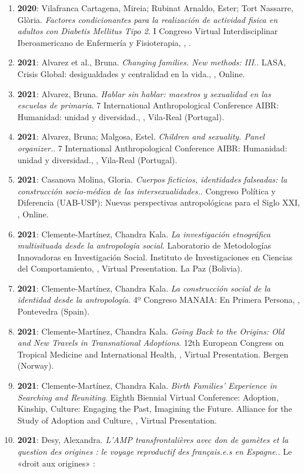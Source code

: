 \begin{enumerate}
\item {\bf 2020}: Vilafranca Cartagena, Mireia; Rubinat Arnaldo, Ester; Tort Nassarre, Glòria. {\it Factores condicionantes para la realización de actividad fisica en adultos con Diabetis Mellitus Tipo 2}. I Congreso Virtual Interdisciplinar Iberoamericano de Enfermería y Fisioterapia, , .\filbreak
\item {\bf 2021}: Alvarez et al., Bruna. {\it Changing families. New methods: III.}. LASA, Crisis Global: desigualdades y centralidad en la vida., , Online.\filbreak
\item {\bf 2021}: Alvarez, Bruna. {\it Hablar sin hablar: maestros y sexualidad en las escuelas de primaria}. 7 International Anthropological Conference AIBR: Humanidad: unidad y diversidad., , Vila-Real (Portugal).\filbreak
\item {\bf 2021}: Alvarez, Bruna; Malgosa, Estel. {\it Children and sexuality. Panel organizer.}. 7 International Anthropological Conference AIBR: Humanidad: unidad y diversidad., , Vila-Real (Portugal).\filbreak
\item {\bf 2021}: Casanova Molina, Gloria. {\it Cuerpos ficticios, identidades falseadas: la construcción socio-médica de las intersexualidades.}. Congreso Política y Diferencia (UAB-USP): Nuevas perspectivas antropológicas para el Siglo XXI, , Online.\filbreak
\item {\bf 2021}: Clemente-Martínez, Chandra Kala. {\it La investigación etnográfica multisituada desde la antropología social}. Laboratorio de Metodologías Innovadoras en Investigación Social. Instituto de Investigaciones en Ciencias del Comportamiento, , Virtual Presentation. La Paz (Bolivia).\filbreak
\item {\bf 2021}: Clemente-Martínez, Chandra Kala. {\it La construcción social de la identidad desde la antropología}. 4º Congreso MANAIA: En Primera Persona, , Pontevedra (Spain).\filbreak
\item {\bf 2021}: Clemente-Martínez, Chandra Kala. {\it Going Back to the Origins: Old and New Travels in Transnational Adoptions}. 12th European Congress on Tropical Medicine and International Health, , Virtual Presentation. Bergen (Norway).\filbreak
\item {\bf 2021}: Clemente-Martínez, Chandra Kala. {\it Birth Families’ Experience in Searching and Reuniting}. Eighth Biennial Virtual Conference: Adoption, Kinship, Culture: Engaging the Past, Imagining the Future. Alliance for the Study of Adoption and Culture, , Virtual Presentation.\filbreak
\item {\bf 2021}: Desy, Alexandra. {\it L’AMP transfrontalières avec don de gamètes et la question des origines : le voyage reproductif des français.e.s en Espagne.}. Le «droit aux origines» :

\end{enumerate}

